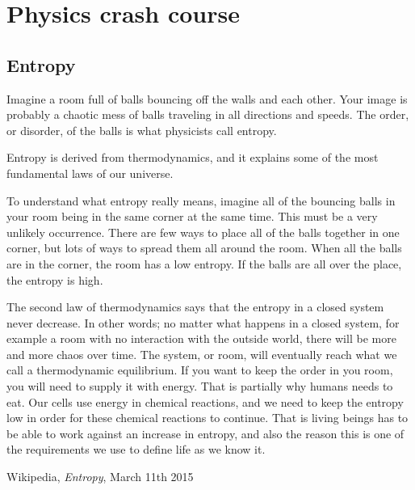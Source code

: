 \section*{Physics crash course}

\subsection*{Entropy}
Imagine a room full of balls bouncing off the walls and each other.
Your image is probably a chaotic mess of balls traveling in all directions and speeds.
The order, or disorder, of the balls is what physicists call entropy.

Entropy is derived from thermodynamics, and it explains some of the most fundamental laws of our universe.

To understand what entropy really means, imagine all of the bouncing balls in your room being in the same corner at the same time.
This must be a very unlikely occurrence.
There are few ways to place all of the balls together in one corner, but lots of ways to spread them all around the room.
When all the balls are in the corner, the room has a low entropy.
If the balls are all over the place, the entropy is high.


The second law of thermodynamics says that the entropy in a closed system never decrease.
In other words; no matter what happens in a closed system, for example a room with no interaction with the outside world, there will be more and more chaos over time.
The system, or room, will eventually reach what we call a thermodynamic equilibrium.
If you want to keep the order in you room, you will need to supply it with energy.
That is partially why humans needs to eat.
Our cells use energy in chemical reactions, and we need to keep the entropy low in order for these chemical reactions to continue.
That is living beings has to be able to work against an increase in entropy, and also the reason this is one of the requirements we use to define life as we know it.

\begin{thebibliography}{99}
		Wikipedia,
		\emph{Entropy},
		March 11th 2015
	\bibitem{}
\end{thebibliography}